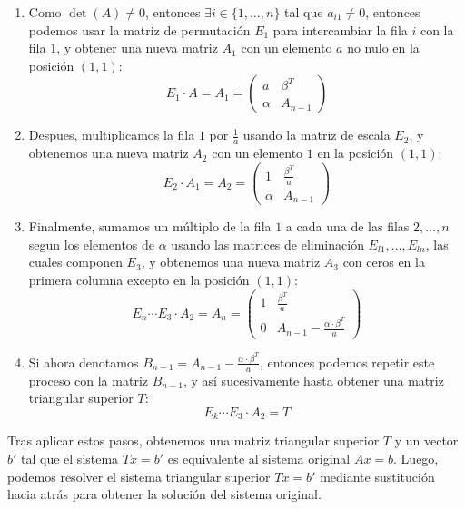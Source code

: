 \begin{proposición}
    \begin{enumerate}
        \item Como $\det(A) \neq 0$, entonces $\exists i \in \{1, \ldots, n\}$ tal que $a_{i1} \neq 0$, entonces podemos usar la matriz de permutación $E_1$ para intercambiar la fila $i$ con la fila $1$, y obtener una nueva matriz $A_1$ con un elemento $a$ no nulo en la posición $(1,1)$:
        \[
            E_1 \cdot A = A_1 =
            \left(
            \begin{array}{c|c}
                a & \beta^T \\ \hline
                \alpha & A_{n-1}
            \end{array}
            \right)
        \]
        \item Despues, multiplicamos la fila $1$ por $\frac{1}{a}$ usando la matriz de escala $E_2$, y obtenemos una nueva matriz $A_2$ con un elemento $1$ en la posición $(1,1)$:
        \[
            E_2 \cdot A_1 = A_2 =
            \left(
            \begin{array}{c|c}
                1 & \frac{\beta^T}{a} \\ \hline
                \alpha & A_{n-1}
            \end{array}
            \right)
        \]
        \item Finalmente, sumamos un múltiplo de la fila $1$ a cada una de las filas $2, \ldots, n$ segun los elementos de $\alpha$ usando las matrices de eliminación $E_{l1}, \ldots, E_{ln}$, las cuales componen $E_3$, y obtenemos una nueva matriz $A_3$ con ceros en la primera columna excepto en la posición $(1,1)$:
        \[
            E_n \cdots E_3 \cdot A_2 = A_n =
            \left(
            \begin{array}{c|c}
                1 & \frac{\beta^T}{a} \\ \hline
                0 & A_{n-1} - \frac{\alpha \cdot \beta^T}{a}
            \end{array}
            \right)
        \]
        \item Si ahora denotamos $B_{n-1} = A_{n-1} - \frac{\alpha \cdot \beta^T}{a}$, entonces podemos repetir este proceso con la matriz $B_{n-1}$, y así sucesivamente hasta obtener una matriz triangular superior $T$:
        \[
            E_k \cdots E_3 \cdot A_2 = T
        \]
    \end{enumerate}
    Tras aplicar estos pasos, obtenemos una matriz triangular superior $T$ y un vector $b'$ tal que el sistema $Tx = b'$ es equivalente al sistema original $Ax = b$. Luego, podemos resolver el sistema triangular superior $Tx = b'$ mediante sustitución hacia atrás para obtener la solución del sistema original.\\
\end{proposición}

